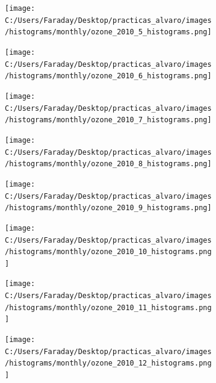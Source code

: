 \documentclass[12pt]{article}
\begin{document}
\begin{figure}[H]
\centering
\begin{subfigure}[h]{0.45\textwidth}
\texttt{[image: C:/Users/Faraday/Desktop/practicas\_alvaro/images/histograms/monthly/ozone\_2010\_5\_histograms.png]}
\caption{}
\label{fig:hist-mon-2-5-2010}
\end{subfigure}
%
\begin{subfigure}[H]{0.45\textwidth}
\texttt{[image: C:/Users/Faraday/Desktop/practicas\_alvaro/images/histograms/monthly/ozone\_2010\_6\_histograms.png]}
\caption{}
\label{fig:hist-mon-2-6-2010}
\end{subfigure}
\caption{}
\end{figure}

\newpage

\begin{figure}[H]
\centering
\begin{subfigure}[h]{0.45\textwidth}
\texttt{[image: C:/Users/Faraday/Desktop/practicas\_alvaro/images/histograms/monthly/ozone\_2010\_7\_histograms.png]}
\caption{}
\label{fig:hist-mon-2-7-2010}
\end{subfigure}
%
\begin{subfigure}[H]{0.45\textwidth}
\texttt{[image: C:/Users/Faraday/Desktop/practicas\_alvaro/images/histograms/monthly/ozone\_2010\_8\_histograms.png]}
\caption{}
\label{fig:hist-mon-2-8-2010}
\end{subfigure}
\caption{}
\end{figure}

\begin{figure}[H]
\centering
\begin{subfigure}[h]{0.45\textwidth}
\texttt{[image: C:/Users/Faraday/Desktop/practicas\_alvaro/images/histograms/monthly/ozone\_2010\_9\_histograms.png]}
\caption{}
\label{fig:hist-mon-2-9-2010}
\end{subfigure}
%
\begin{subfigure}[H]{0.45\textwidth}
\texttt{[image: C:/Users/Faraday/Desktop/practicas\_alvaro/images/histograms/monthly/ozone\_2010\_10\_histograms.png]}
\caption{}
\label{fig:hist-mon-2-10-2010}
\end{subfigure}
\caption{}
\end{figure}

\begin{figure}[H]
\centering
\begin{subfigure}[h]{0.45\textwidth}
\texttt{[image: C:/Users/Faraday/Desktop/practicas\_alvaro/images/histograms/monthly/ozone\_2010\_11\_histograms.png]}
\caption{}
\label{fig:hist-mon-2-11-2010}
\end{subfigure}
%
\begin{subfigure}[H]{0.45\textwidth}
\texttt{[image: C:/Users/Faraday/Desktop/practicas\_alvaro/images/histograms/monthly/ozone\_2010\_12\_histograms.png]}
\caption{}
\label{fig:hist-mon-2-12-2010}
\end{subfigure}
\caption{}
\end{figure}
\end{document}
